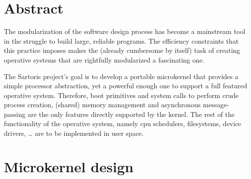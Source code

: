 \documentclass[11pt, letterpaper, twoside, english]{book}
\begin{document}
\frontmatter
\thispagestyle{empty}

\vspace*{2.5cm}
\noindent{}

\vspace{10cm}
\noindent{}

\newpage
\thispagestyle{empty}
\cleardoublepage

\chapter{Abstract}

The modularization of the software design process has become a mainstream tool in the struggle to build large, reliable programs. The efficiency constraints that this practice imposes makes the (already cumbersome by itself) task of creating operative systems that are rightfully modularized a fascinating one.

The Sartoris project's goal is to develop a portable microkernel that provides a simple processor abstraction, yet a powerful enough one to support a full featured operative system. Therefore, boot primitives and system calls to perform crude process creation, (shared) memory management and asynchronous message-passing are the only features directly supported by the kernel. The rest of the functionality of the operative system, namely cpu schedulers, filesystems,  device drivers, \ldots{} are to be implemented in user space.


\tableofcontents

\mainmatter

\chapter{Microkernel design}
\end{document}

